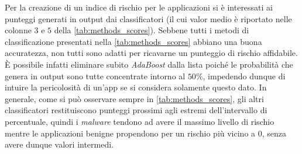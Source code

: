 \documentclass[12pt,a4paper,oneside]{article}
\begin{document}
Per la creazione di un indice di rischio per le applicazioni si è interessati ai punteggi generati in output dai classificatori (il cui valor medio è riportato nelle colonne $3$ e $5$ della \cref{tab:methods_scores}). Sebbene tutti i metodi di classificazione presentati nella \cref{tab:methods_scores} abbiano una buona accuratezza, non tutti sono adatti per ricavarne un punteggio di rischio affidabile. È possibile infatti eliminare subito \textit{AdaBoost} dalla lista poiché le probabilità che genera in output sono tutte concentrate intorno al $50\%$, impedendo dunque di intuire la pericolosità di un'app se si considera solamente questo dato. In generale, come si può osservare sempre in \cref{tab:methods_scores}, gli altri classificatori restituiscono punteggi prossimi agli estremi dell'intervallo di percentuale, quindi i \textit{malware} tendono ad avere il massimo livello di rischio mentre le applicazioni benigne propendono per un rischio più vicino a $0$, senza avere dunque valori intermedi.
\end{document}
